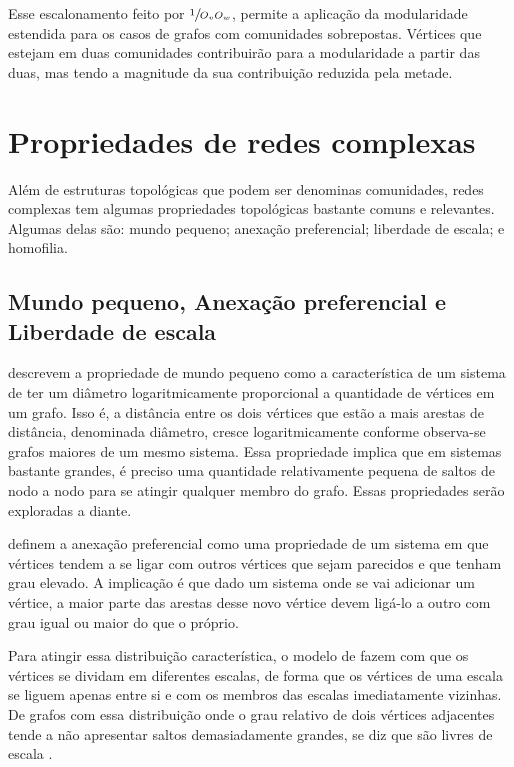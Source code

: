 \documentclass[notes.tex]{subfiles}
\begin{document}
Esse escalonamento feito por $\sfrac{1}{O_vO_w}$, permite a aplicação da modularidade estendida para os casos de grafos com comunidades sobrepostas.
Vértices que estejam em duas comunidades contribuirão para a modularidade a partir das duas, mas tendo a magnitude da sua contribuição reduzida pela metade.

\section{Propriedades de redes complexas\label{sec:propriedades_redes}}

Além de estruturas topológicas que podem ser denominas comunidades, redes complexas tem algumas propriedades topológicas bastante comuns e relevantes.
Algumas delas são: mundo pequeno; anexação preferencial; liberdade de escala; e homofilia.

\subsection{Mundo pequeno, Anexação preferencial e Liberdade de escala}

 descrevem a propriedade de mundo pequeno como a característica de um sistema de ter um diâmetro logaritmicamente proporcional a quantidade de vértices em um grafo.
Isso é, a distância entre os dois vértices que estão a mais arestas de distância, denominada diâmetro, cresce logaritmicamente conforme observa-se grafos maiores de um mesmo sistema.
Essa propriedade implica que em sistemas bastante grandes, é preciso uma quantidade relativamente pequena de saltos de nodo a nodo para se atingir qualquer membro do grafo.
Essas propriedades serão exploradas a diante.

 definem a anexação preferencial como uma propriedade de um sistema em que vértices tendem a se ligar com outros vértices que sejam parecidos e que tenham grau elevado.
A implicação é que dado um sistema onde se vai adicionar um vértice, a maior parte das arestas desse novo vértice devem ligá-lo a outro com grau igual ou maior do que o próprio.

Para atingir essa distribuição característica, o modelo de  fazem com que os vértices se dividam em diferentes escalas, de forma que os vértices de uma escala se liguem apenas entre si e com os membros das escalas imediatamente vizinhas.
De grafos com essa distribuição onde o grau relativo de dois vértices adjacentes tende a não apresentar saltos demasiadamente grandes, se diz que são livres de escala \cite{largeron2015generating}.
\end{document}
